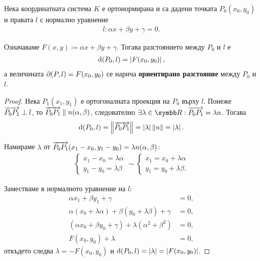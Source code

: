 \documentclass[numbers=endperiod, bibliography=totocnumbered]{scrartcl}
\begin{document}
\begin{theorem}\label{thm:plane_distance}
  Нека координатната система \( K \) е ортонормирана и са дадени точката \( P_0(x_0, y_0) \) и правата \( l \) с нормално уравнение
  \begin{align*}
    l: \alpha x + \beta y + \gamma = 0.
  \end{align*}

  Означаваме \( F(x, y) \coloneqq \alpha x + \beta y + \gamma \). Тогава разстоянието между \( P_0 \) и \( l \) е
  \begin{align*}
    \operatorname{d}(P_0, l) = \left\vert F(x_0, y_0) \right\vert,
  \end{align*}
  а величината \( \partial(P, l) = F(x_0, y_0) \) се нарича \textbf{ориентирано разстояние} между \( P_0 \) и \( l \).
\end{theorem}
\begin{proof}
  Нека \( P_1(x_1, y_1) \) е ортогоналната проекция на \( P_0 \) върху \( l \). Понеже \( \overrightarrow{P_0 P_1} \perp l \), то \( \overrightarrow{P_0 P_1} \parallel n(\alpha, \beta) \), следователно \( \exists \lambda \in \R: \V{P_0 P_1} = \lambda n \). Тогава
  \begin{align*}
    \operatorname{d}(P_0, l)
    =
    \left\Vert \overrightarrow{P_0 P_1} \right\Vert
    =
    \left\vert \lambda \right\vert \left\Vert n \right\Vert
    =
    \left\vert \lambda \right\vert.
  \end{align*}

  Намираме \( \lambda \) от \( \overrightarrow{P_0 P_1}(x_1 - x_0, y_1 - y_0) = \lambda n(\alpha, \beta) \):
  \begin{align*}
    \begin{cases}
      x_1 - x_0 = \lambda \alpha \\
      y_1 - y_0 = \lambda \beta
    \end{cases}
    \sim
    \begin{cases}
      x_1 = x_0 + \lambda \alpha \\
      y_1 = y_0 + \lambda \beta.
    \end{cases}
  \end{align*}

  Заместваме в нормалното уравнение на \( l \):
  \begin{align*}
    \alpha x_1 + \beta y_1 + \gamma &= 0,
    \\
    \alpha (x_0 + \lambda \alpha) + \beta (y_0 + \lambda \beta) + \gamma &= 0,
    \\
    (\alpha x_0 + \beta y_0 + \gamma) + \lambda(\alpha^2 + \beta^2) &= 0,
    \\
    F(x_0, y_0) + \lambda &= 0,
  \end{align*}
  откъдето следва \( \lambda = -F(x_0, y_0) \) и \( \operatorname{d}(P_0, l) = \left\vert \lambda \right\vert = \left\vert F(x_0, y_0) \right\vert \).
\end{proof}
\end{document}
